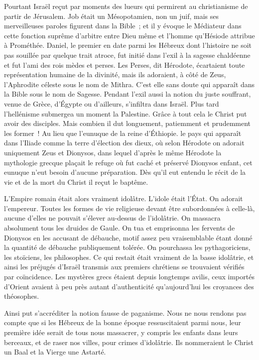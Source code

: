 \documentclass[french,twoside]{book} %
\begin{document}
Pourtant Israël reçut par moments des lueurs qui permirent au christianisme de partir de Jérusalem. Job était un Mésopotamien, non un juif, mais ses merveilleuses paroles figurent dans la Bible ; et il y évoque le Médiateur dans cette fonction suprême d'arbitre entre Dieu même et l'homme qu'Hésiode attribue à Prométhée. Daniel, le premier en date parmi les Hébreux dont l'histoire ne soit pas souillée par quelque trait atroce, fut initié dans l'exil à la sagesse chaldéenne et fut l'ami des rois mèdes et perses. Les Perses, dit Hérodote, écartaient toute représentation humaine de la divinité, mais ils adoraient, à côté de Zeus, l'Aphrodite céleste sous le nom de Mithra. C'est elle sans doute qui apparaît dans la Bible sous le nom de Sagesse. Pendant l'exil aussi la notion du juste souffrant, venue de Grèce, d'Égypte ou d'ailleurs, s'infiltra dans Israël. Plus tard l'hellénisme submergea un moment la Palestine. Grâce à tout cela le Christ put avoir des disciples. Mais combien il dut longuement, patiemment et prudemment les former ! Au lieu que l'eunuque de la reine d'Éthiopie. le pays qui apparaît dans l'Iliade comme la terre d'élection des dieux, où selon Hérodote on adorait uniquement Zeus et Dionysos, dans lequel d'après le même Hérodote la mythologie grecque plaçait le refuge où fut caché et préservé Dionysos enfant, cet eunuque n'eut besoin d'aucune préparation. Dès qu'il eut entendu le récit de la vie et de la mort du Christ il reçut le baptême.\par
L'Empire romain était alors vraiment idolâtre. L'idole était l'État. On adorait l'empereur. Toutes les formes de vie religieuse devant être subordonnées à celle-là, aucune d'elles ne pouvait s'élever au-dessus de l'idolâtrie. On massacra absolument tous les druides de Gaule. On tua et emprisonna les fervents de Dionysos en les accusant de débauche, motif assez peu vraisemblable étant donné la quantité de débauche publiquement tolérée. On pourchassa les pythagoriciens, les stoïciens, les philosophes. Ce qui restait était vraiment de la basse idolâtrie, et ainsi les préjugés d'Israël transmis aux premiers chrétiens se trouvaient vérifiés par coïncidence. Les mystères grecs étaient depuis longtemps avilis, ceux importés d'Orient avaient à peu près autant d'authenticité qu'aujourd'hui les croyances des théosophes.\par
Ainsi put s'accréditer la notion fausse de paganisme. Nous ne nous rendons pas compte que si les Hébreux de la bonne époque ressuscitaient parmi nous, leur première idée serait de tous nous massacrer, y compris les enfants dans leurs berceaux, et de raser nos villes, pour crimes d'idolâtrie. Ils nommeraient le Christ un Baal et la Vierge une Astarté.\par
\end{document}
